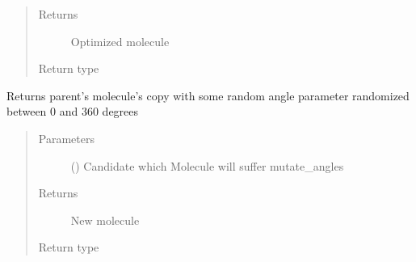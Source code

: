 \documentclass[letterpaper,10pt,english]{sphinxmanual}
\begin{document}
\begin{fulllineitems}
\begin{fulllineitems}
\begin{quote}
\begin{description}
\item[{Returns}] \leavevmode
\sphinxAtStartPar
Optimized molecule

\item[{Return type}] \leavevmode
\sphinxAtStartPar
{\hyperref[\detokenize{MolOpt.molecular:MolOpt.molecular.molecular.Molecule}]{}}

\end{description}\end{quote}

\end{fulllineitems}


\begin{fulllineitems}
\label{\detokenize{MolOpt:MolOpt.MolOpt.MolOpt.mutate_angles}}
\sphinxAtStartPar
Returns parent’s molecule’s copy with some random angle parameter randomized between 0 and 360 degrees
\begin{quote}\begin{description}
\item[{Parameters}] \leavevmode
\sphinxAtStartPar
{} ({\hyperref[\detokenize{MolOpt.genetic:MolOpt.genetic.genetic.Chromosome}]{}}) \textendash{} Candidate which Molecule will suffer mutate\_angles

\item[{Returns}] \leavevmode
\sphinxAtStartPar
New molecule

\item[{Return type}] \leavevmode
\sphinxAtStartPar
{\hyperref[\detokenize{MolOpt.molecular:MolOpt.molecular.molecular.Molecule}]{}}

\end{description}\end{quote}

\end{fulllineitems}


\end{fulllineitems}
\end{document}
